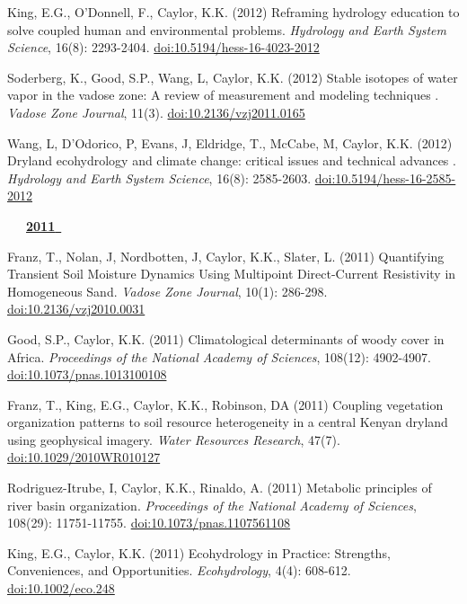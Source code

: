 \begin{etaremune}
\item King, E.G., O'Donnell, F., Caylor, K.K. (2012) Reframing hydrology education to solve coupled human and environmental problems. \emph{Hydrology and Earth System Science}, 16(8): 2293-2404. \href{https://doi.org/10.5194/hess-16-4023-2012}{doi:10.5194/hess-16-4023-2012}
\item Soderberg, K., Good, S.P., Wang, L, Caylor, K.K. (2012) Stable isotopes of water vapor in the vadose zone: A review of measurement and modeling techniques 
. \emph{Vadose Zone Journal}, 11(3). \href{https://doi.org/10.2136/vzj2011.0165}{doi:10.2136/vzj2011.0165}
\item Wang, L, D'Odorico, P, Evans, J, Eldridge, T., McCabe, M, Caylor, K.K. (2012) Dryland ecohydrology and climate change: critical issues and technical advances . \emph{Hydrology and Earth System Science}, 16(8): 2585-2603. \href{https://doi.org/10.5194/hess-16-2585-2012}{doi:10.5194/hess-16-2585-2012}

\mbox{\ \ \ \underline{\textbf{2011 }}}

\item Franz, T., Nolan, J, Nordbotten, J, Caylor, K.K., Slater, L. (2011) Quantifying Transient Soil Moisture Dynamics Using Multipoint Direct-Current Resistivity in Homogeneous Sand. \emph{Vadose Zone Journal}, 10(1): 286-298. \href{https://doi.org/10.2136/vzj2010.0031}{doi:10.2136/vzj2010.0031}
\item Good, S.P., Caylor, K.K. (2011) Climatological determinants of woody cover in Africa. \emph{Proceedings of the National Academy of Sciences}, 108(12): 4902-4907. \href{https://doi.org/10.1073/pnas.1013100108}{doi:10.1073/pnas.1013100108}
\item Franz, T., King, E.G., Caylor, K.K., Robinson, DA (2011) Coupling vegetation organization patterns to soil resource heterogeneity in a central Kenyan dryland using geophysical imagery. \emph{Water Resources Research}, 47(7). \href{https://doi.org/10.1029/2010WR010127}{doi:10.1029/2010WR010127}
\item Rodriguez-Itrube, I, Caylor, K.K., Rinaldo, A. (2011) Metabolic principles of river basin organization. \emph{Proceedings of the National Academy of Sciences}, 108(29): 11751-11755. \href{https://doi.org/10.1073/pnas.1107561108}{doi:10.1073/pnas.1107561108}
\item King, E.G., Caylor, K.K. (2011) Ecohydrology in Practice: Strengths, Conveniences, and Opportunities. \emph{Ecohydrology}, 4(4): 608-612. \href{https://doi.org/10.1002/eco.248}{doi:10.1002/eco.248}


\end{etaremune}
